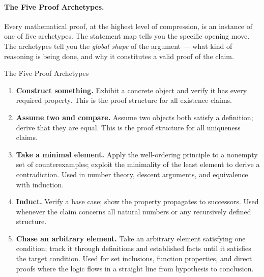 \paragraph{The Five Proof Archetypes.}

Every mathematical proof, at the highest level of compression, is an
instance of one of five archetypes. The statement map tells you the
specific opening move. The archetypes tell you the \emph{global shape}
of the argument --- what kind of reasoning is being done, and why it
constitutes a valid proof of the claim.

\begin{propositionbox}{The Five Proof Archetypes}
\begin{enumerate}
  \item \textbf{Construct something.}
    Exhibit a concrete object and verify it has every required property.
    This is the proof structure for all existence claims.

  \item \textbf{Assume two and compare.}
    Assume two objects both satisfy a definition; derive that they are
    equal. This is the proof structure for all uniqueness claims.

  \item \textbf{Take a minimal element.}
    Apply the well-ordering principle to a nonempty set of counterexamples;
    exploit the minimality of the least element to derive a contradiction.
    Used in number theory, descent arguments, and equivalence with induction.

  \item \textbf{Induct.}
    Verify a base case; show the property propagates to successors.
    Used whenever the claim concerns all natural numbers or any
    recursively defined structure.

  \item \textbf{Chase an arbitrary element.}
    Take an arbitrary element satisfying one condition; track it through
    definitions and established facts until it satisfies the target condition.
    Used for set inclusions, function properties, and direct proofs where
    the logic flows in a straight line from hypothesis to conclusion.
\end{enumerate}
\end{propositionbox}

